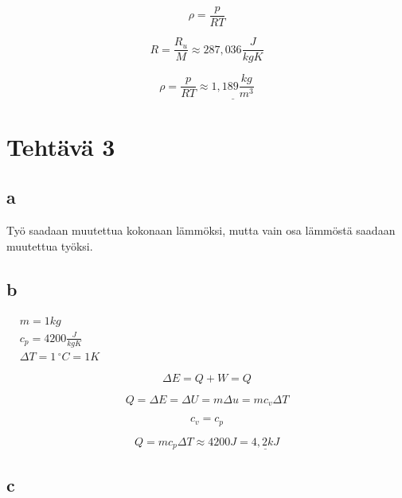 \documentclass[12pt,a4paper,finnish]{article}
\begin{document}
\begin{equation}
 \rho = \frac{p}{RT}
\end{equation}

\begin{equation}
 R = \frac{R_u}{M} \approx 287,036 \frac{J}{kgK}
\end{equation}

\begin{equation}
 \rho = \frac{p}{RT} \approx \underline{1,189 \frac{kg}{m^3}}
\end{equation}

\section{Tehtävä 3}

\subsection{a}

Työ saadaan muutettua kokonaan lämmöksi, mutta vain osa lämmöstä saadaan muutettua työksi.

\subsection{b}

\begin{math}
 \begin{aligned}
  &m = 1 kg\\
  &c_p = 4200 \frac{J}{kgK}\\
  &\Delta T = 1\,^{\circ}C = 1 K
 \end{aligned}
\end{math}

\begin{equation}
 \Delta E = Q + W = Q
\end{equation}

\begin{equation}
 Q = \Delta E = \Delta U = m\Delta u = mc_v\Delta T
\end{equation}

\begin{equation}
 c_v = c_p
\end{equation}

\begin{equation}
 Q = mc_p\Delta T \approx 4200 J = \underline{4,2 kJ}
\end{equation}

\subsection{c}
\end{document}
